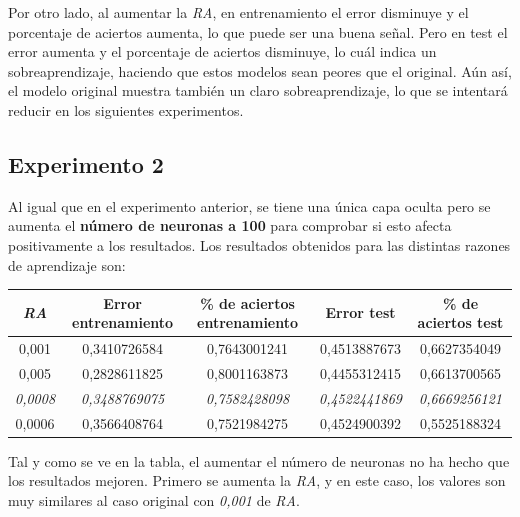 \documentclass{uc3mpracticas}
\begin{document}
\vspace{1mm}

Por otro lado, al aumentar la \textit{RA}, en entrenamiento el error disminuye y el porcentaje de aciertos aumenta, lo que puede ser una buena señal. Pero en test el error aumenta y el porcentaje de aciertos disminuye, lo cuál indica un sobreaprendizaje, haciendo que estos modelos sean peores que el original. Aún así, el modelo original muestra también un claro sobreaprendizaje, lo que se intentará reducir en los siguientes experimentos.


\subsection{Experimento 2}

Al igual que en el experimento anterior, se tiene una única capa oculta pero se aumenta el \textbf{número de neuronas a 100} para comprobar si esto afecta positivamente a los resultados. Los resultados obtenidos para las distintas razones de aprendizaje son:

\begin{center}
  \begin{tabular}{|c|c|c|c|c|}
    \hline
        \textit{\textbf{RA}}  & \textbf{Error entrenamiento} & \textbf{\% de aciertos entrenamiento} & \textbf{Error test} & \textbf{\% de aciertos test}\\ \hline
        0,001                 &  0,3410726584                &  0,7643001241                         &  0,4513887673       &  0,6627354049               \\ \hline
        0,005                 &  0,2828611825                &  0,8001163873                         &  0,4455312415       &  0,6613700565               \\ \hline
        \textit{0,0008}       &  \textit{0,3488769075}       &  \textit{0,7582428098}                &  \textit{0,4522441869}&  \textit{0,6669256121}               \\ \hline
        0,0006                &  0,3566408764                &  0,7521984275                         &  0,4524900392       &  0,5525188324               \\ \hline

  \end{tabular}
\end{center}

Tal y como se ve en la tabla, el aumentar el número de neuronas no ha hecho que los resultados mejoren. Primero se aumenta la \textit{RA}, y en este caso, los valores son muy similares al caso original con \textit{0,001} de \textit{RA}.
\end{document}
